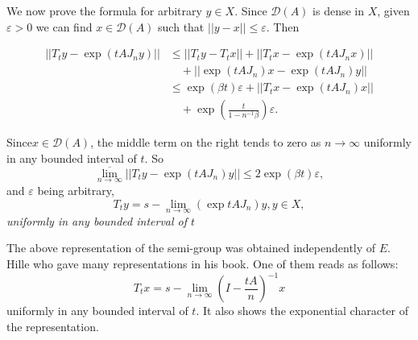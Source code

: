 We now prove the formula for arbitrary $y \in X$. Since
$\mathscr{D}(A)$ is dense in $X$, given $\varepsilon >0$ we can find
$x \in \mathscr{D}(A)$ such that $|| y-x|| \le \varepsilon$. Then 

\begin{align*}
 || T_t y-\exp (t A J_n y) || & \le || T_ty - T_tx || + || T_t x-
 \exp (tA J_n x) ||\\ 
 & \quad + || \exp (t A J_n)x - \exp(t A J_n)y ||\\
 & \le \exp(\beta t) \varepsilon + || T_t x- \exp ( t A J_n)x ||\\
 & \quad + \exp \left(\frac{t}{1-n^{-1} \beta }\right) \varepsilon.
\end{align*}

Since\pageoriginale $x \in \mathscr{D}(A)$, the middle term on the right tends to zero
as $n \to \infty$ uniformly in any bounded interval of $t$. So 
$$
\overline{\lim\limits_{n \to \infty}} || T_t y- \exp (t A J_n)y || \le
2 \exp (\beta t) \varepsilon, 
$$
and $\varepsilon$ being arbitrary,
$$
T_t y = s- \lim_{n \to \infty} (\exp t A J_n)y, y \in X,
$$
\textit{uniformly in any bounded interval of $t$}

\begin{remark*}%
 The above representation of the semi-group was obtained
 independently of $E$. Hille who gave many representations in his
 book. One of them reads as follows: 
 $$
 T_t x= s- \lim_{n \to \infty} \left(I - \frac{tA}{n}\right)^{-1} x
 $$ 
 uniformly in any bounded interval of $t$. It also shows the
 exponential character of the representation. 
\end{remark*}
